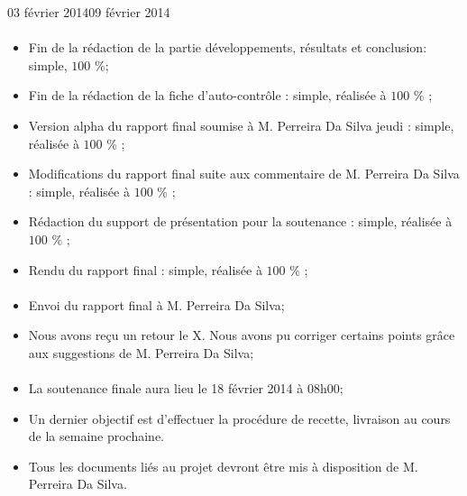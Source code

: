 \documentclass[11pt, french,screen]{report-rd-info}
\begin{document}
\begin{fichesuivi}{03 février 2014}{09 février 2014}
\paragraph{}
	\begin{travaileffectue}
		\begin{itemize}
			\item  Fin de la rédaction de la partie développements, résultats et conclusion: simple, $100$ \%;
			\item Fin de la rédaction de la fiche d’auto-contrôle  : simple, réalisée à $100$ \% ;
			\item Version alpha du rapport final soumise à M. Perreira Da Silva jeudi :  simple, réalisée à $100$ \% ;
			\item Modifications du rapport final suite aux commentaire de   M. Perreira Da Silva : simple, réalisée à $100$ \% ;
			\item Rédaction du support de présentation pour la soutenance : simple, réalisée à $100$ \% ;
			\item Rendu du rapport final : simple, réalisée à $100$ \% ;
		\end{itemize}
	\end{travaileffectue}


\paragraph{}
	\begin{echange}
		\begin{itemize}
			\item Envoi du rapport final à M. Perreira Da Silva;
			\item Nous avons reçu un retour le X. Nous avons pu corriger certains points grâce aux suggestions de M. Perreira Da Silva;
		\end{itemize}
	\end{echange}

\paragraph*{}
	\begin{planification}
		\begin{itemize}
			\item La soutenance finale aura lieu le 18 février 2014 à 08h00;
			\item Un dernier objectif est d’effectuer la procédure de recette, livraison au cours de la semaine prochaine.
			\item Tous les documents liés au projet devront être mis à disposition de M. Perreira Da Silva.
\end{itemize}
	\end{planification}
\end{fichesuivi}
\end{document}
